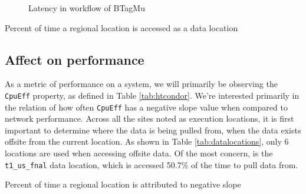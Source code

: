 \documentclass[sigconf]{acmart}
\begin{document}
\begin{figure}[!htb]
		\caption{Latency in workflow of BTagMu}
		\label{fig:btagmu}
	\endminipage\hfill
\end{figure}

\begin{table}
	\caption{Percent of time a regional location is accessed as a data location}
	\label{tab:datalocations}
\end{table}
\subsection{Affect on performance}
As a metric of performance on a system, we will primarily be observing the \texttt{CpuEff} property, as defined in Table \ref{tab:htcondor}. We're interested primarily in the relation of how often \texttt{CpuEff} has a negative slope value when compared to network performance. Across all the sites noted as execution locations, it is first important to determine where the data is being pulled from, when the data exists offsite from the current location. As shown in Table \ref{tab:datalocations}, only 6 locations are used when accessing offsite data. Of the most concern, is the \texttt{t1\_us\_fnal} data location, which is accessed 50.7\% of the time to pull data from.
\begin{table}
	\caption{Percent of time a regional location is attributed to negative slope}
	\label{tab:badop}
\end{table}
\end{document}
